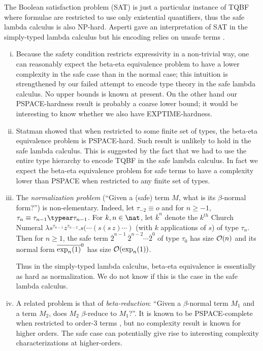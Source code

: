 \begin{remark}
The Boolean satisfaction problem (SAT) is just a particular instance of TQBF
where formulae are restricted to use only existential quantifiers, thus
the safe lambda calculus is also NP-hard. Asperti gave an interpretation of SAT in the simply-typed lambda calculus but his encoding relies on unsafe terms \cite{asperti-np}.
\end{remark}


\begin{remark}
\begin{enumerate}[(i)]
\item Because the safety condition restricts expressivity
in a non-trivial way, one can reasonably expect the
beta-eta equivalence problem to have a
lower complexity in the safe case than in the normal case; this intuition is strengthened by our failed attempt to encode type theory in the safe lambda calculus. No upper bounds is known at present. On the other hand our PSPACE-hardness result is probably a coarse lower bound; it would be interesting to know whether we also have EXPTIME-hardness.

\item %
Statman showed \cite{Statman:1979:TLE} that
when restricted to some finite set of types, the beta-eta equivalence problem is PSPACE-hard.
Such result is unlikely to hold in the safe lambda calculus. This is suggested by the fact that we had to use the entire type hierarchy to encode TQBF in the safe lambda calculus.
In fact we expect the beta-eta equivalence problem for safe terms to have a complexity lower than PSPACE when restricted to any finite set of types.


\item
The \emph{normalization problem} (``Given a (safe) term $M$, what is its $\beta$-normal form?'') is non-elementary. Indeed, let $\tau_{-2}
\equiv o$ and for $n\geq -1$, $\tau_n \equiv \tau_{n-1}\typear
\tau_{n-1}$. For $k,n\in \nat$, let $\overline{k}^n$ denote
the $k^{th}$ Church Numeral $\lambda s^{\tau_{n-1}}
z^{\tau_{n-2}} . s( \cdots (s(s\,z) \cdots)$ (with $k$ applications of $s$) of type $\tau_n$. Then for $n\geq1$, the safe term
$\overline{2}^{n-1}~\overline{2}^{n-2}\cdots \overline{2}^0$ of type
$\tau_0$ has size $\mathcal{O}(n)$ and its normal form
$\overline{\exp_{n}(1)}^0$ has size $\mathcal{O}(\exp_{n}(1))$.

Thus in the simply-typed lambda calculus, beta-eta equivalence is essentially as hard as normalization.
We do not know if this is the case in the safe lambda calculus.

\item %
A related problem is that of \emph{beta-reduction}: ``Given a $\beta$-normal term $M_1$
 and a term $M_2$, does $M_2$ $\beta$-reduce to $M_1$?''. It is known to be PSPACE-complete when restricted to order-$3$ terms \cite{schubert2001cbr}, but no complexity result is known for higher orders. The safe case can potentially give rise to interesting complexity characterizations at higher-orders.

\end{enumerate}
\end{remark}
